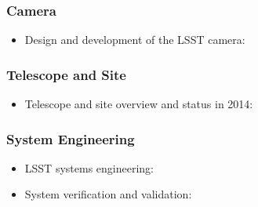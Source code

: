 \subsubsection{Camera}

\begin{itemize}
   \item Design and development of the LSST camera: \cite{2010SPIE.7735E..0JK}
\end{itemize}


\subsubsection{Telescope and Site}

\begin{itemize}
   \item Telescope and site overview and status in 2014:  \cite{2014SPIE.9145E..1AG}
\end{itemize}

\subsubsection{System Engineering}

\begin{itemize}
   \item LSST systems engineering: \cite{2014SPIE.9150E..0MC}
   \item System verification and validation: \cite{2014SPIE.9150E..0NS}
\end{itemize}
%


